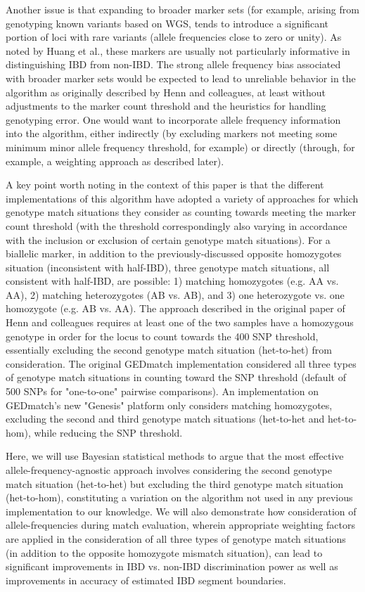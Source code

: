 \documentclass{article}
\begin{document}
Another issue is that expanding to broader marker sets (for example, arising from genotyping known variants based on WGS, tends to introduce a significant portion of loci with rare variants (allele frequencies close to zero or unity). As noted by Huang et al.,\citep{speeDB} these markers are usually not particularly informative in distinguishing IBD from non-IBD. The strong allele frequency bias associated with broader marker sets would be expected to lead to unreliable behavior in the algorithm as originally described by Henn and colleagues, at least without adjustments to the marker count threshold and the heuristics for handling genotyping error. One would want to incorporate allele frequency information into the algorithm, either indirectly (by excluding markers not meeting some minimum minor allele frequency threshold, for example) or directly (through, for example, a weighting approach as described later).

A key point worth noting in the context of this paper is that the different implementations of this algorithm have adopted a variety of approaches for which genotype match situations they consider as counting towards meeting the marker count threshold (with the threshold correspondingly also varying in accordance with the inclusion or exclusion of certain genotype match situations). For a biallelic marker, in addition to the previously-discussed opposite homozygotes situation (inconsistent with half-IBD), three genotype match situations, all consistent with half-IBD, are possible: 1) matching homozygotes (e.g. AA vs. AA), 2) matching heterozygotes (AB vs. AB), and 3) one heterozygote vs. one homozygote (e.g. AB vs. AA). The approach described in the original paper of Henn and colleagues requires at least one of the two samples have a homozygous genotype in order for the locus to count towards the 400 SNP threshold, essentially excluding the second genotype match situation (het-to-het) from consideration. The original GEDmatch implementation considered all three types of genotype match situations in counting toward the SNP threshold (default of 500 SNPs for "one-to-one" pairwise comparisons). An implementation on GEDmatch's new "Genesis" platform only considers matching homozygotes, excluding the second and third genotype match situations (het-to-het and het-to-hom), while reducing the SNP threshold.

Here, we will use Bayesian statistical methods to argue that the most effective allele-frequency-agnostic approach involves considering the second genotype match situation (het-to-het) but excluding the third genotype match situation (het-to-hom), constituting a variation on the algorithm not used in any previous implementation to our knowledge. We will also demonstrate how consideration of allele-frequencies during match evaluation, wherein appropriate weighting factors are applied in the consideration of all three types of genotype match situations (in addition to the opposite homozygote mismatch situation), can lead to significant improvements in IBD vs. non-IBD discrimination power as well as improvements in accuracy of estimated IBD segment boundaries.
\end{document}
